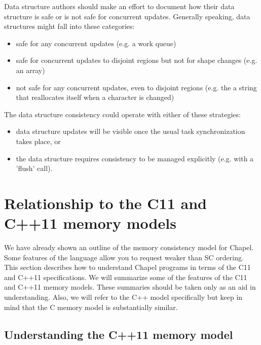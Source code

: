 Data structure authors should make an effort to document how their data
structure is safe or is not safe for concurrent updates. Generally speaking,
data structures might fall into these categories:

\begin{itemize}

\item safe for any concurrent updates (e.g. a work queue)

\item safe for concurrent updates to disjoint regions but not for shape
changes (e.g. an array)

\item not safe for any concurrent updates, even to disjoint regions (e.g.
the a string that reallocates itself when a character is changed)

\end{itemize}

The data structure consistency could operate with either of these
strategies:

\begin{itemize}

\item data structure updates will be visible once the usual task
synchronization takes place, or

\item the data structure requires consistency to be managed explicitly
(e.g. with a 'flush' call).

\end{itemize}

\section{Relationship to the C11 and C++11 memory models}
\label{relating_to_C_MCM}

We have already shown an outline of the memory consistency model for Chapel.
Some features of the language allow you to request weaker than SC ordering.
This section describes how to understand Chapel programs in terms of the C11
and C++11 specifications. We will summarize some of the features of the C11 and
C++11 memory models. These summaries should be taken only as an aid in
understanding. Also, we will refer to the C++ model specifically but keep
in mind that the C memory model is substantially similar.

\subsection{Understanding the C++11 memory model}


